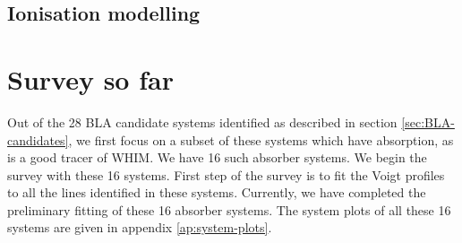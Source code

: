 \subsection{Ionisation modelling}





\section{Survey so far} \label{sec:OVI-BLA}

Out of the 28 BLA candidate systems identified as described in section \ref{sec:BLA-candidates}, we first focus on a subset of these systems which have  absorption, as  is a good tracer of WHIM. We have 16 such absorber systems. We begin the survey with these 16 systems. First step of the survey is to fit the Voigt profiles to all the lines identified in these systems. Currently, we have completed the preliminary fitting of these 16 absorber systems. The system plots of all these 16 systems are given in appendix \ref{ap:system-plots}.

